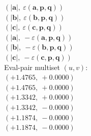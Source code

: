 \documentclass[a4paper,11pt]{article}
\newcommand{\vc}[1]{\ensuremath{\mathbf{#1}}}
\newcommand{\dnfagmiihhiejm}[1]{|\vc{#1}|}
\newcommand{\kblbmcpggoncpf}[3]{\varepsilon(\mathbf{#1},\mathbf{#2},\mathbf{#3})}
\begin{document}
$(\dnfagmiihhiejm{a},\ \kblbmcpggoncpf{a}{p}{q})$\\
$(\dnfagmiihhiejm{b},\ \kblbmcpggoncpf{b}{p}{q})$\\
$(\dnfagmiihhiejm{c},\ \kblbmcpggoncpf{c}{p}{q})$\\
$(\dnfagmiihhiejm{a},\ -\kblbmcpggoncpf{a}{p}{q})$\\
$(\dnfagmiihhiejm{b},\ -\kblbmcpggoncpf{b}{p}{q})$\\
$(\dnfagmiihhiejm{c},\ -\kblbmcpggoncpf{c}{p}{q})$\\
\quad Eval-pair multiset $(u, v)$:\\
$(+1.4765,\ +0.0000)$\\
$(+1.4765,\ +0.0000)$\\
$(+1.3342,\ +0.0000)$\\
$(+1.3342,\ -0.0000)$\\
$(+1.1874,\ -0.0000)$\\
$(+1.1874,\ -0.0000)$\\
\end{document}

